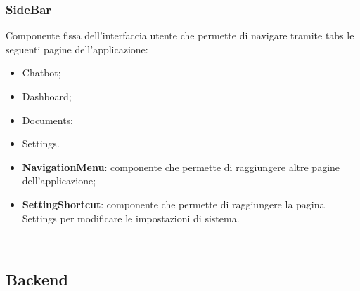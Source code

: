 \documentclass[10pt, a4paper]{article}
\begin{document}
\subsubsection{SideBar}
Componente fissa dell'interfaccia utente che permette di navigare tramite tabs le seguenti pagine dell'applicazione:\\
\begin{itemize}
    \item Chatbot;
    \item Dashboard;
    \item Documents;
    \item Settings.
\end{itemize}
\begin{itemize}
    \item \label{NavigationMenu}\textbf{NavigationMenu}: componente che permette di raggiungere altre pagine dell'applicazione;
    \item \label{SettingShortcut}\textbf{SettingShortcut}: componente che permette di raggiungere la pagina Settings per modificare le impostazioni di sistema.
\end{itemize}
 -







\subsection{Backend}
    
\end{document}
